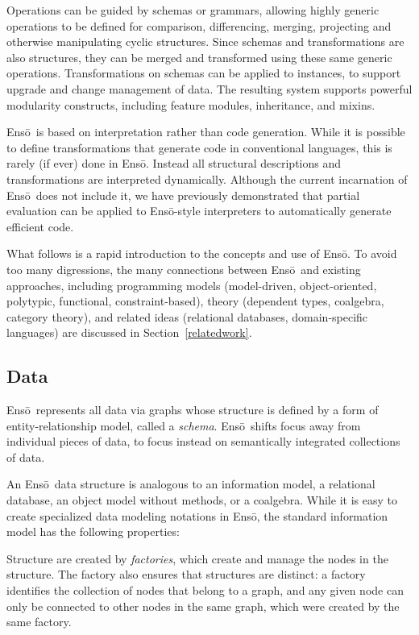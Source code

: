 \documentclass[11pt]{article}
\newcommand{\Enso}{Ens\={o}}
\begin{document}
Operations can be guided by schemas or grammars, allowing highly
generic operations to be defined for comparison, differencing, 
merging, projecting and otherwise manipulating cyclic structures.
Since schemas and transformations are also structures, they can
be merged and transformed using these same generic operations.
Transformations on schemas can be applied to instances, to support
upgrade and change management of data.
The resulting system supports powerful modularity constructs,
including feature modules, inheritance, and mixins.

\Enso\ is based on interpretation rather than code generation. 
While it is possible to define transformations that generate code
in conventional languages, this is rarely (if ever) done in \Enso.
Instead all structural descriptions and transformations are 
interpreted dynamically. Although the current incarnation of \Enso\
does not include it, we have previously demonstrated that partial
evaluation can be applied to \Enso-style interpreters to automatically
generate efficient code.

What follows is a rapid introduction to the concepts and use of
\Enso. To avoid too many digressions, 
the many connections between \Enso\ and existing approaches,
including programming models
(model-driven, object-oriented, polytypic, functional, constraint-based), theory (dependent types, coalgebra, category theory),
and related ideas (relational databases, domain-specific languages)
are discussed in Section~\ref{relatedwork}.
\subsection{Data}

\Enso\ represents all data via graphs whose structure is defined
by a form of entity-relationship model, called a \textit{schema}. 
\Enso\ shifts focus away from individual pieces of data, to focus instead
on semantically integrated collections of data. 

An \Enso\ data structure is analogous to an information model,
a relational database, an object model without methods, or a coalgebra.
While it is easy to create specialized data modeling notations
in \Enso, the standard information model has the following properties:

Structure are created by \textit{factories}, which create
and manage the nodes in the structure. The factory also
ensures that structures are distinct: a factory identifies the 
collection of nodes that belong to a graph, and any given node 
can only be connected to other nodes in the same graph, which were
created by the same factory.
\end{document}

